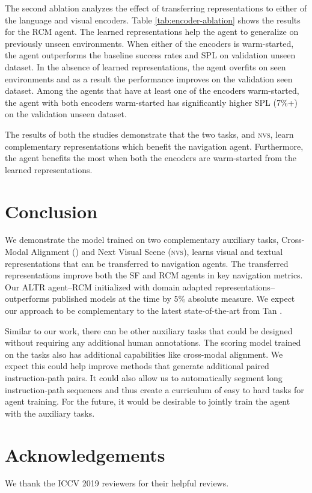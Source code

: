 \documentclass[10pt,twocolumn,letterpaper]{article}
\newcommand{\tasknvs}{\textsc{nvs}}
\begin{document}
The second ablation analyzes the effect of transferring representations to either of the language and visual encoders. Table \ref{tab:encoder-ablation} shows the results for the RCM agent. The learned representations help the agent to generalize on previously unseen environments. When either of the encoders is warm-started, the agent outperforms the baseline success rates and SPL on validation unseen dataset. In the absence of learned representations, the agent overfits on seen environments and as a result the performance improves on the validation seen dataset. Among the agents that have at least one of the encoders warm-started, the agent with both encoders warm-started has significantly higher SPL (7\%+) on the validation unseen dataset.

The results of both the studies demonstrate that the two tasks, {\taskcma} and {\tasknvs}, learn complementary representations which benefit the navigation agent. Furthermore, the agent benefits the most when both the encoders are warm-started from the learned representations. 
\section{Conclusion}
\label{sec:conclusion}

We demonstrate the model trained on two complementary auxiliary tasks, Cross-Modal Alignment ({\taskcma}) and Next Visual Scene ({\tasknvs}), learns visual and textual representations that can be transferred to navigation agents. The transferred representations improve both the SF and RCM agents in key navigation metrics. Our ALTR agent--RCM initialized with domain adapted representations--outperforms published models at the time by 5\% absolute measure. We expect our approach to be complementary to the latest state-of-the-art from Tan \etal \cite{Tan:2019:EnvironmentalDropout}.

Similar to our work, there can be other auxiliary tasks that could be designed without requiring any additional human annotations. The scoring model trained on the tasks also has additional capabilities like cross-modal alignment. We expect this could help improve methods that generate additional paired instruction-path pairs. It could also allow us to automatically segment long instruction-path sequences and thus create a curriculum of easy to hard tasks for agent training. For the future, it would be desirable to jointly train the agent with the auxiliary tasks.

%
 
\section*{Acknowledgements}
\noindent
We thank the ICCV 2019 reviewers for their helpful reviews.
\end{document}
